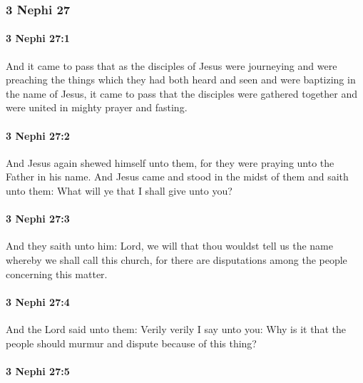 	\subsubsection{3 Nephi 27} %
		\label{3NEPHI-27}
		
		\paragraph{3 Nephi 27:1} %
			\label{3NEPHI-27-1}

			And it came to pass that as the disciples of Jesus were journeying
			and were preaching the things which they had both heard and seen
			and were baptizing in the name of Jesus,
			it came to pass that the disciples were gathered together
			and were united in mighty prayer and fasting.

		\paragraph{3 Nephi 27:2} %
			\label{3NEPHI-27-2}

			And Jesus again shewed himself unto them,
			for they were praying unto the Father in his name.
			And Jesus came and stood in the midst of them
			and saith unto them:
			What will ye that I shall give unto you?

		\paragraph{3 Nephi 27:3} %
			\label{3NEPHI-27-3}

			And they saith unto him:
			Lord, we will that thou wouldst tell us the name
			whereby we shall call this church,
			for there are disputations among the people concerning this matter.

		\paragraph{3 Nephi 27:4} %
			\label{3NEPHI-27-4}

			And the Lord said unto them:
			Verily verily I say unto you:
			Why is it that the people should murmur and dispute because of this thing?

		\paragraph{3 Nephi 27:5} %
			\label{3NEPHI-27-5}

